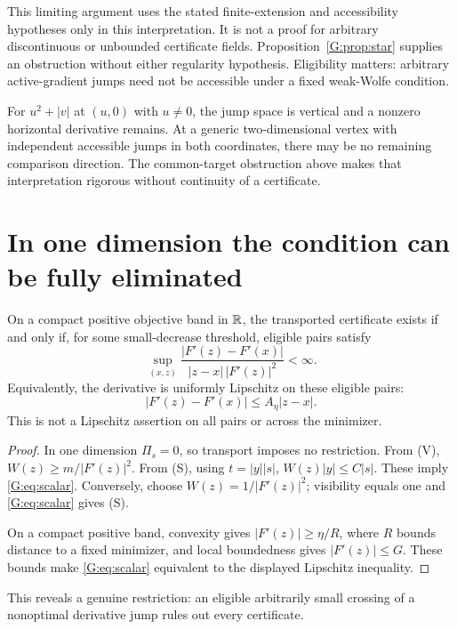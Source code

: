This limiting argument uses the stated finite-extension and accessibility hypotheses only in this interpretation. It is not a proof for arbitrary discontinuous or unbounded certificate fields. Proposition~\ref{G:prop:star} supplies an obstruction without either regularity hypothesis. Eligibility matters: arbitrary active-gradient jumps need not be accessible under a fixed weak-Wolfe condition.

For $u^2+|v|$ at $(u,0)$ with $u\ne0$, the jump space is vertical and a nonzero horizontal derivative remains. At a generic two-dimensional vertex with independent accessible jumps in both coordinates, there may be no remaining comparison direction. The common-target obstruction above makes that interpretation rigorous without continuity of a certificate.


\setcounter{section}{5}
\setcounter{theorem}{0}
\setcounter{equation}{5}


\section{In one dimension the condition can be fully eliminated}
\begin{proposition}
On a compact positive objective band in $\mathbb R$, the transported certificate exists if and only if, for some small-decrease threshold, eligible pairs satisfy
\begin{equation}
 \sup_{(x,z)}\frac{|F'(z)-F'(x)|}{|z-x|\,|F'(z)|^2}<\infty. \label{G:eq:scalar}
\end{equation}
Equivalently, the derivative is uniformly Lipschitz on these eligible pairs:
\[
 |F'(z)-F'(x)|\le A_\eta|z-x|.
\]
This is not a Lipschitz assertion on all pairs or across the minimizer.
\end{proposition}
\begin{proof}
In one dimension $\Pi_s=0$, so transport imposes no restriction. From (V),
$W(z)\ge m/|F'(z)|^2$. From (S), using $t=|y||s|$,
$W(z)|y|\le C|s|$. These imply \eqref{G:eq:scalar}. Conversely, choose
$W(z)=1/|F'(z)|^2$; visibility equals one and \eqref{G:eq:scalar} gives (S).

On a compact positive band, convexity gives $|F'(z)|\ge\eta/R$, where $R$ bounds distance to a fixed minimizer, and local boundedness gives $|F'(z)|\le G$. These bounds make \eqref{G:eq:scalar} equivalent to the displayed Lipschitz inequality.
\end{proof}
This reveals a genuine restriction: an eligible arbitrarily small crossing of a nonoptimal derivative jump rules out every certificate.

